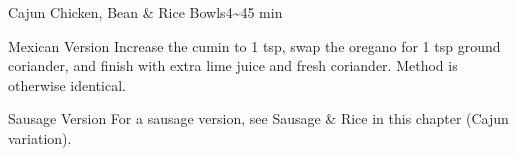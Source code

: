 \begin{recipebox}{Cajun Chicken, Bean \& Rice Bowls}{4}{\textasciitilde45 min}
\begin{variationbox}{Mexican Version}
Increase the cumin to 1 tsp, swap the oregano for 1 tsp ground coriander, and finish with extra lime juice and fresh coriander. Method is otherwise identical.
\end{variationbox}

\begin{variationbox}{Sausage Version}
For a sausage version, see Sausage \& Rice in this chapter (Cajun variation).
\end{variationbox}

\end{recipebox}

